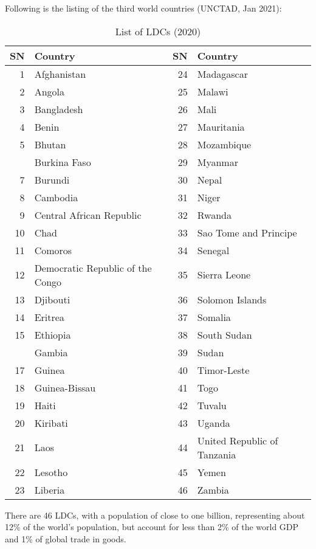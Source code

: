 \documentclass[
  openany]{book}
\begin{document}
Following is the listing of the third world countries (UNCTAD, Jan 2021):

\begin{table}

\caption{\label{tab:ldcs-unctad}List of LDCs (2020)}
\centering
\begin{tabular}[t]{rlrl}
\toprule
SN & Country & SN & Country\\
\midrule
\rowcolor{gray!6}  1 & Afghanistan & 24 & Madagascar\\
2 & Angola & 25 & Malawi\\
\rowcolor{gray!6}  3 & Bangladesh & 26 & Mali\\
4 & Benin & 27 & Mauritania\\
\rowcolor{gray!6}  5 & Bhutan & 28 & Mozambique\\
\addlinespace
6 & Burkina Faso & 29 & Myanmar\\
\rowcolor{gray!6}  7 & Burundi & 30 & Nepal\\
8 & Cambodia & 31 & Niger\\
\rowcolor{gray!6}  9 & Central African Republic & 32 & Rwanda\\
10 & Chad & 33 & Sao Tome and Principe\\
\addlinespace
\rowcolor{gray!6}  11 & Comoros & 34 & Senegal\\
12 & Democratic Republic of the Congo & 35 & Sierra Leone\\
\rowcolor{gray!6}  13 & Djibouti & 36 & Solomon Islands\\
14 & Eritrea & 37 & Somalia\\
\rowcolor{gray!6}  15 & Ethiopia & 38 & South Sudan\\
\addlinespace
16 & Gambia & 39 & Sudan\\
\rowcolor{gray!6}  17 & Guinea & 40 & Timor-Leste\\
18 & Guinea-Bissau & 41 & Togo\\
\rowcolor{gray!6}  19 & Haiti & 42 & Tuvalu\\
20 & Kiribati & 43 & Uganda\\
\addlinespace
\rowcolor{gray!6}  21 & Laos & 44 & United Republic of Tanzania\\
22 & Lesotho & 45 & Yemen\\
\rowcolor{gray!6}  23 & Liberia & 46 & Zambia\\
\bottomrule
\end{tabular}
\end{table}

There are 46 LDCs, with a population of close to one billion, representing about 12\% of the world's population, but account for less than 2\% of the world GDP and 1\% of global trade in goods.
\end{document}
